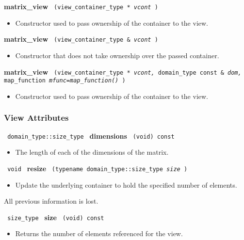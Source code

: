 \noindent
\textbf{matrix\_view}%
\texttt{%
(view\_container\_type *
\textit{vcont}%
)
}

\begin{itemize}
\item
Constructor used to pass ownership of the container to the view.
\end{itemize}

\noindent
\textbf{matrix\_view}%
\texttt{%
(view\_container\_type \&
\textit{vcont}%
)
}

\begin{itemize}
\item
Constructor that does not take ownership over the passed container.
\end{itemize}

\noindent
\textbf{matrix\_view}%
\texttt{%
(view\_container\_type *
\textit{vcont,}%
domain\_type const \&
\textit{dom,}%
map\_function
\textit{mfunc=map\_function()}%
)
}

\begin{itemize}
\item
Constructor used to pass ownership of the container to the view.
\end{itemize}

\subsubsection{ View Attributes}

\noindent
\texttt{%
domain\_type::size\_type
}
\newline
\textbf{dimensions}%
\texttt{%
(void) const
}

\begin{itemize}
\item
The length of each of the dimensions of the matrix.
\end{itemize}

\noindent
\texttt{%
void
}
\newline
\textbf{resize}%
\texttt{%
(typename domain\_type::size\_type
\textit{size}%
)
}

\begin{itemize}
\item
Update the underlying container to hold the specified number of elements.
\end{itemize}
All previous information is lost.

\noindent
\texttt{%
size\_type
}
\newline
\textbf{size}%
\texttt{%
(void) const
}

\begin{itemize}
\item
Returns the number of elements referenced for the view.
\end{itemize}

